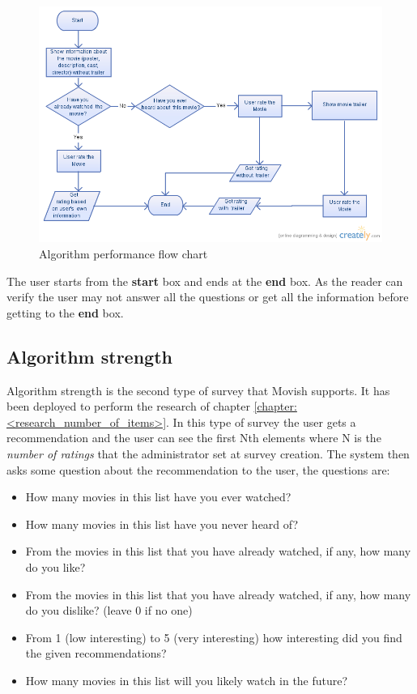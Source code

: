 \begin{figure}
  \centering
  \includegraphics[width=\textwidth]{figures/algorithm_performance_flow_chart.png}
  \caption{Algorithm performance flow chart}
  \label{fig:algorithm_performance_flow_chart}
\end{figure}

The user starts from the \textbf{start} box and ends at the \textbf{end} box. As the reader can verify the user may not answer all the questions or get all the information before getting to the \textbf{end} box.

\subsection{Algorithm strength}
\label{sec:algorithm_strenght}

Algorithm strength is the second type of survey that Movish supports. It has been deployed to perform the research of chapter \ref{chapter:<research_number_of_items>}. In this type of survey the user gets a recommendation and the user can see the first Nth elements where N is the \textit{number of ratings} that the administrator set at survey creation. The system then asks some question about the recommendation to the user, the questions are:

\begin{itemize}
\item How many movies in this list have you ever watched?
\item How many movies in this list have you never heard of?
\item From the movies in this list that you have already watched, if any, how many do you like?
\item From the movies in this list that you have already watched, if any, how many do you dislike? (leave 0 if no one)
\item From 1 (low interesting) to 5 (very interesting) how interesting did you find the given recommendations?
\item How many movies in this list will you likely watch in the future?
\end{itemize}

